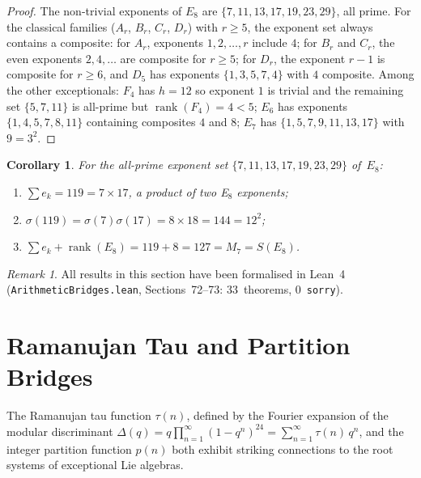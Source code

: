 \documentclass[11pt]{amsart}
\theoremstyle{plain}
\newtheorem{corollary}[theorem]{Corollary}
\theoremstyle{definition}
\theoremstyle{remark}
\newtheorem{remark}[theorem]{Remark}
\newcommand{\rank}{\operatorname{rank}}
\begin{document}
\begin{proof}
The non-trivial exponents of $E_8$ are
$\{7, 11, 13, 17, 19, 23, 29\}$, all prime.
For the classical families ($A_r$, $B_r$, $C_r$, $D_r$) with $r \ge 5$,
the exponent set always contains a composite: for $A_r$, exponents
$1, 2, \ldots, r$ include $4$; for $B_r$ and $C_r$, the even exponents
$2, 4, \ldots$ are composite for $r \ge 5$; for $D_r$, the exponent
$r-1$ is composite for $r \ge 6$, and $D_5$ has exponents
$\{1,3,5,7,4\}$ with $4$ composite.
Among the other exceptionals: $F_4$ has $h=12$ so exponent $1$ is
trivial and the remaining set $\{5,7,11\}$ is all-prime but
$\rank(F_4) = 4 < 5$; $E_6$ has exponents $\{1,4,5,7,8,11\}$
containing composites $4$ and $8$; $E_7$ has $\{1,5,7,9,11,13,17\}$
with $9 = 3^2$.
\end{proof}

\begin{corollary}\label{cor:e8-prime-numerology}
For the all-prime exponent set $\{7,11,13,17,19,23,29\}$ of~$E_8$:
\begin{enumerate}[\upshape(i)]
  \item $\sum e_k = 119 = 7 \times 17$, a product of two E$_8$
    exponents;
  \item $\sigma(119) = \sigma(7)\sigma(17) = 8 \times 18 = 144 = 12^2$;
  \item $\sum e_k + \rank(E_8) = 119 + 8 = 127 = M_7 = S(E_8)$.
\end{enumerate}
\end{corollary}

\begin{remark}\label{rem:lean-sigma-sums}
All results in this section have been formalised in Lean~4
(\texttt{ArithmeticBridges.lean}, Sections~72--73:
33~theorems, 0~\texttt{sorry}).
\end{remark}

\section{Ramanujan Tau and Partition Bridges}\label{sec:ramanujan}

The Ramanujan tau function $\tau(n)$, defined by the Fourier expansion of
the modular discriminant $\Delta(q) = q\prod_{n=1}^{\infty}(1-q^n)^{24}
= \sum_{n=1}^{\infty}\tau(n)\,q^n$, and the integer partition function
$p(n)$ both exhibit striking connections to the root systems of
exceptional Lie algebras.
\end{document}
